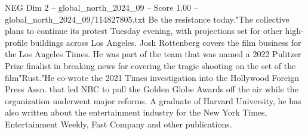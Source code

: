 \begin{textsample}{NEG Dim 2 – global\_north\_2024\_09 – Score 1.00 – global\_north\_2024\_09/114827805.txt}
Be the resistance today."The collective plans to continue its protest Tuesday evening, with projections set for other high-profile buildings across Los Angeles.
Josh Rottenberg covers the film business for the Los Angeles Times.
He was part of the team that was named a 2022 Pulitzer Prize finalist in breaking news for covering the tragic shooting on the set of the film"Rust."He co-wrote the 2021 Times investigation into the Hollywood Foreign Press Assn. that led NBC to pull the Golden Globe Awards off the air while the organization underwent major reforms.
A graduate of Harvard University, he has also written about the entertainment industry for the New York Times, Entertainment Weekly, Fast Company and other publications.

\end{textsample}
